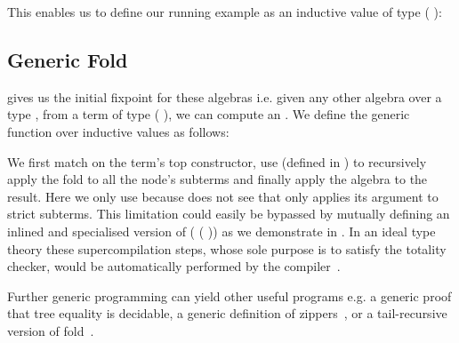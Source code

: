 \noindent
\begin{minipage}[t]{.3\textwidth}
\end{minipage}\hfill
\begin{minipage}[t]{.65\textwidth}
\end{minipage}

This enables us to define our running example as an inductive value
of type ( ):


\subsection{Generic Fold}\label{sec:genericfoldinductive}

 gives us the initial fixpoint for these algebras i.e.
given any other algebra over a type , from a term of
type ( ), we can compute an .
%
We define the generic  function over inductive values
as follows:


We first match on the term's top constructor, use 
(defined in )
to recursively apply the fold to all the node's subterms and finally
apply the algebra to the result.
%
Here we only use \assertTotal{} because \idris{} does not see that
 only applies its argument to strict subterms.
This limitation could easily be bypassed by mutually defining
an inlined and specialised version of
( \IdrisKeyword{\KatlaUnderscore} ( ))
as we demonstrate in .
%
In an ideal type theory these supercompilation steps, whose sole
purpose is to satisfy the totality checker, would be automatically
performed by the compiler~\citep{MANUAL:phd/dublin/Mendel12}.


Further generic programming can yield other useful programs e.g. a
generic proof that tree equality is decidable,
a generic definition of zippers~\citep{DBLP:conf/icfp/LohM11},
or a tail-recursive version of fold~\citep{DBLP:conf/icfp/CortinasS18}.
